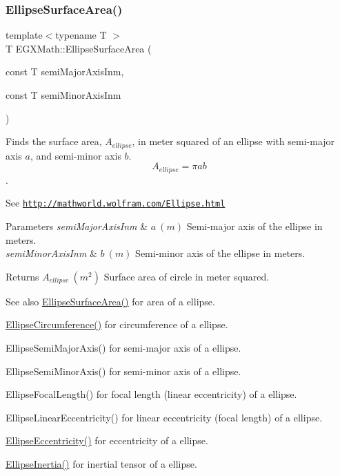 \subsubsection{\texorpdfstring{Ellipse\+Surface\+Area()}{EllipseSurfaceArea()}}
{\footnotesize\ttfamily template$<$typename T $>$ \\
T E\+G\+X\+Math\+::\+Ellipse\+Surface\+Area (\begin{DoxyParamCaption}\item[{const T}]{semi\+Major\+Axis\+Inm,  }\item[{const T}]{semi\+Minor\+Axis\+Inm }\end{DoxyParamCaption})}



Finds the surface area, $A_{ellipse}$, in meter squared of an ellipse with semi-\/major axis $a$, and semi-\/minor axis $b$. \[ A_{ellipse}=\pi a b \]. 

See \href{http://mathworld.wolfram.com/Ellipse.html}{\tt http\+://mathworld.\+wolfram.\+com/\+Ellipse.\+html}


\begin{DoxyParams}{Parameters}
{\em semi\+Major\+Axis\+Inm} & $ a\ (m)$ Semi-\/major axis of the ellipse in meters. \\
\hline
{\em semi\+Minor\+Axis\+Inm} & $ b\ (m)$ Semi-\/minor axis of the ellipse in meters. \\
\hline
\end{DoxyParams}
\begin{DoxyReturn}{Returns}
$ A_{ellipse}\ (m^2)$ Surface area of circle in meter squared. 
\end{DoxyReturn}
\begin{DoxySeeAlso}{See also}
\mbox{\hyperlink{group___e_g_x_math-_geometry-2_d-_ellipse_ga4ce8c8323e9718ce5458f4ab7f6d823d}{Ellipse\+Surface\+Area()}} for area of a ellipse. 

\mbox{\hyperlink{group___e_g_x_math-_geometry-2_d-_ellipse_ga4172802ac674eb53467b44928ac635c7}{Ellipse\+Circumference()}} for circumference of a ellipse. 

Ellipse\+Semi\+Major\+Axis() for semi-\/major axis of a ellipse. 

Ellipse\+Semi\+Minor\+Axis() for semi-\/minor axis of a ellipse. 

Ellipse\+Focal\+Length() for focal length (linear eccentricity) of a ellipse. 

Ellipse\+Linear\+Eccentricity() for linear eccentricity (focal length) of a ellipse. 

\mbox{\hyperlink{group___e_g_x_math-_geometry-2_d-_ellipse-_eccentricity_ga6a0a7fba17f782616894cfc447628c33}{Ellipse\+Eccentricity()}} for eccentricity of a ellipse. 

\mbox{\hyperlink{group___e_g_x_math-_geometry-2_d-_ellipse_gad679a65dc7550e27dc69c1d328c94732}{Ellipse\+Inertia()}} for inertial tensor of a ellipse. 
\end{DoxySeeAlso}
